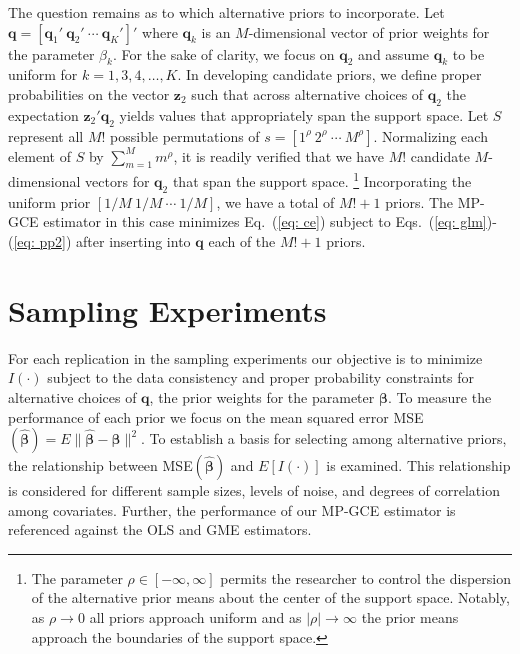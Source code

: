 \documentclass{elsarticle}
\begin{document}
The question remains as to which alternative priors to incorporate.
Let $\mathbf{q}=[\mathbf{q}_1' ~ \mathbf{q}_2' ~ \cdots ~ \mathbf{q}_K' ]'$ where
$\mathbf{q}_k$ is an $M$-dimensional vector of prior weights for the parameter 
$\beta_k$.
For the sake of clarity, we focus on $\mathbf{q}_2$ and assume $\mathbf{q}_k$ to 
be uniform for $k=1,3,4,\ldots, K$.
In developing candidate priors, we define proper probabilities on the vector 
$\mathbf{z}_2$ such that across alternative choices of $\mathbf{q}_2$ the 
expectation $\mathbf{z}_2'\mathbf{q}_2$  yields values that appropriately
span the support space. 
Let $S$ represent all  $M!$ possible permutations of 
$s = [1^\rho ~ 2^\rho ~ \cdots ~ M^\rho]$.
Normalizing each element of $S$ by $\sum_{m=1}^M m^\rho$, it is 
readily verified that we have $M!$ candidate $M$-dimensional vectors for 
$\mathbf{q}_2$ that span the support space.%
\footnote{The parameter $\rho \in [-\infty, \infty]$ permits the researcher
to control the dispersion of the alternative prior means about the center of the 
support space.
Notably, as $\rho \to 0$ all priors approach uniform and as $|\rho| \to 
\infty$ the prior means approach the boundaries of the support space.}
Incorporating the uniform prior $[1/M ~ 1/M ~ \cdots ~ 1/M]$, we have a total
of $M! + 1$ priors.
The MP-GCE estimator in this case minimizes Eq.\ (\ref{eq: ce}) subject 
to Eqs.\ (\ref{eq: glm})-(\ref{eq: pp2}) after inserting into $\mathbf{q}$ 
each of the $M! + 1$ priors.


\section{Sampling Experiments}
\label{sec: mce}

For each replication in the sampling experiments our objective is to minimize 
$I(\cdot)$ subject to the data consistency and proper probability constraints 
for alternative choices of $\mathbf{q}$, the prior weights for the parameter 
$\mathbf{\beta}$. 
To measure the performance of each prior we focus on the mean squared 
error MSE$(\hat{\mathbf{\beta}}) = E \| \hat{\mathbf{\beta}}- 
\mathbf{\beta}\|^2$.
To establish a basis for selecting among alternative priors, the relationship 
between MSE$(\hat{\mathbf{\beta}})$ and $E[I(\cdot)]$ is examined.
This relationship is considered for different sample sizes, levels of noise, 
and degrees of correlation among covariates.
Further, the performance of our MP-GCE estimator is referenced 
against the OLS and GME estimators.
\end{document}
